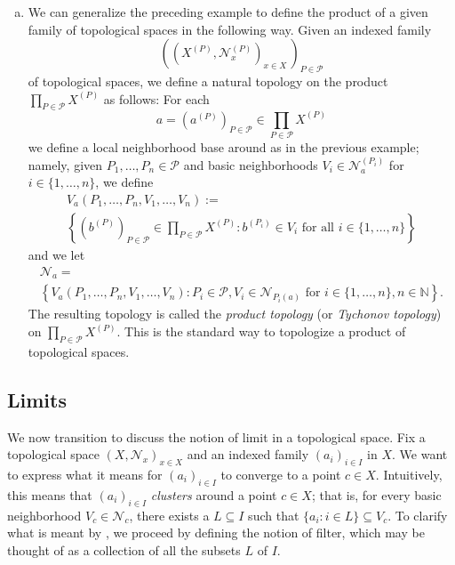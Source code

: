 \documentclass{scrartcl}
\newcommand{\SP}{\mathscr{P}}
\begin{document}
\begin{example}
\begin{enumerate}[(a)]
\item
\label{I:product topology}
We can generalize the preceding example to define the product of a given family of topological spaces in the following way. Given an indexed family
\[
\left( (X^{(P)},\mathscr{N}_x^{(P)})_{x\in X} \, \right)_{P\in \SP}
\]
of topological spaces, we define a natural topology on the product $\prod_{P\in\SP}X^{(P)}$ as follows: For each
\[
a= \left(a^{(P)}\right)_{P\in\SP} \in \prod_{P\in\SP}X^{(P)}
\]
we define a local neighborhood base around as in the previous example; namely, given  $P_1,\dots,P_n\in\mathscr{P}$ and basic neighborhoods $V_{i}\in\mathscr{N}_{a}^{(P_i)}$ for $i\in\{1,\dots,n\}$, we define
\begin{multline*}
V_a(P_1,\dots, P_n,V_1,\dots, V_n):= \\
\left\{ \left(b^{(P)}\right)_{P\in\SP} \in \prod_{P\in\SP}X^{(P)} 
\colon b^{(P_i)}\in V_i \text{ for all } i\in \{ 1,\dots, n\} \right\}
\end{multline*}
and we let
\begin{multline*}
\mathscr{N}_a = \\
\left\{ V_a(P_1,\dots, P_n,V_1,\dots, V_n) 
\colon 
P_i\in\mathscr{P}, V_{i}\in\mathscr{N}_{P_i(a)} \text{ for $i\in\{1,\dots,n\}$}, n\in\mathbb{N} \right\}\text{.}
\end{multline*}
The resulting topology is called the \emph{product topology} (or \emph{Tychonov topology}) on $\prod_{P\in\SP}X^{(P)}$. This is the standard way to topologize a product of topological spaces.

\end{enumerate}
\end{example}

\subsection{Limits}

We now transition to discuss the notion of limit in a topological space. Fix a topological space $(X,\mathscr{N}_x)_{x\in X}$ and an indexed family $(a_i)_{i\in I}$ in $X$. We want to express what it means for $(a_i)_{i\in I}$ to converge to a point $c\in X$. Intuitively, this means that $(a_i)_{i\in I}$ \emph{clusters} around a point $c\in X$; that is, for every basic neighborhood $V_c\in \mathscr{N}_c$, there exists a  $L\subseteq I$ such that $\{a_i \colon i\in L\}\subseteq V_c$. To clarify what is meant by , we proceed by defining the notion of filter, which may be thought of as a collection of all the  subsets $L$ of $I$.
\end{document}
